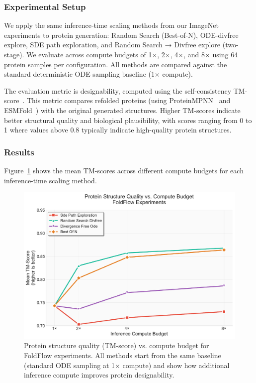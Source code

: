 \documentclass{article}
\begin{document}
\subsubsection{Experimental Setup}

We apply the same inference-time scaling methods from our ImageNet experiments to protein generation: Random Search (Best-of-N), ODE-divfree explore, SDE path exploration, and Random Search → Divfree explore (two-stage). We evaluate across compute budgets of 1×, 2×, 4×, and 8× using 64 protein samples per configuration. All methods are compared against the standard deterministic ODE sampling baseline (1× compute).

The evaluation metric is designability, computed using the self-consistency TM-score~\cite{wu2024foldflow}. This metric compares refolded proteins (using ProteinMPNN~\cite{dauparas2022protein} and ESMFold~\cite{lin2022language}) with the original generated structures. Higher TM-scores indicate better structural quality and biological plausibility, with scores ranging from 0 to 1 where values above 0.8 typically indicate high-quality protein structures.

\subsubsection{Results}

Figure~\ref{fig:protein-scaling} shows the mean TM-scores across different compute budgets for each inference-time scaling method.

\begin{figure}[H]
  \centering
  \includegraphics[width=0.8\linewidth]{figures/protein_scaling_tm_score.pdf}
  \caption{Protein structure quality (TM-score) vs. compute budget for FoldFlow experiments. All methods start from the same baseline (standard ODE sampling at 1× compute) and show how additional inference compute improves protein designability.}
  \label{fig:protein-scaling}
\end{figure}
\end{document}
